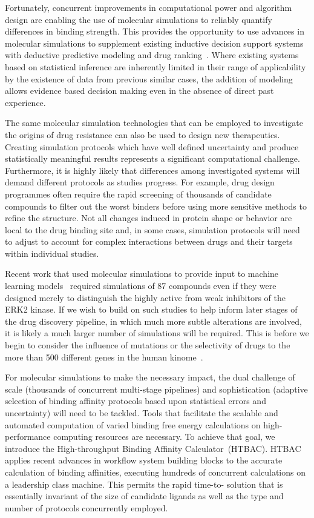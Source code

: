 \documentclass{bmcart}
\begin{document}
Fortunately, concurrent improvements in computational power and algorithm
design are enabling the use of molecular simulations to reliably quantify
differences in binding strength. This provides the opportunity to use
advances in molecular simulations to supplement existing inductive decision
support systems with deductive predictive modeling and drug
ranking~\cite{Marias2011, Sloot2009}. Where existing systems based on
statistical inference are inherently limited in their range of applicability
by the existence of data from previous similar cases, the addition of
modeling allows evidence based decision making even in the absence of direct
past experience.

The same molecular simulation technologies that can be employed to
investigate the origins of drug resistance can also be used to design new
therapeutics. Creating simulation protocols which have well defined
uncertainty and produce statistically meaningful results represents a
significant computational challenge. Furthermore, it is highly likely that
differences among investigated systems will demand different protocols as
studies progress. For example, drug design programmes often require the rapid
screening of thousands of candidate compounds to filter out the worst binders
before using more sensitive methods to refine the structure. Not all changes
induced in protein shape or behavior are local to the drug binding site and,
in some cases, simulation protocols will need to adjust to account for
complex interactions between drugs and their targets within individual
studies.

Recent work that used molecular simulations to provide input to machine
learning models~\cite{Ash2017} required simulations of 87 compounds even if
they were designed merely to distinguish the highly active from weak
inhibitors of the ERK2 kinase. If we wish to build on such studies to help
inform later stages of the drug discovery pipeline, in which much more subtle
alterations are involved, it is likely a much larger number of simulations
will be required. This is before we begin to consider the influence of
mutations or the selectivity of drugs to the more than 500 different genes in
the human kinome~\cite{Li2016}.

For molecular simulations to make the necessary impact, the dual challenge of
scale (thousands of concurrent multi-stage pipelines) and sophistication
(adaptive selection of binding affinity protocols based upon statistical
errors and uncertainty) will need to be tackled. Tools that facilitate the
scalable and automated computation of varied binding free energy calculations
on high-performance computing resources are necessary. To achieve that goal,
we introduce the High-throughput Binding Affinity Calculator~(HTBAC). HTBAC
applies recent advances in workflow system building blocks to the accurate
calculation of binding affinities, executing hundreds of concurrent
calculations on a leadership class machine. This permits the rapid time-to-
solution that is essentially invariant of the size of candidate ligands as
well as the type and number of protocols concurrently employed.
\end{document}
